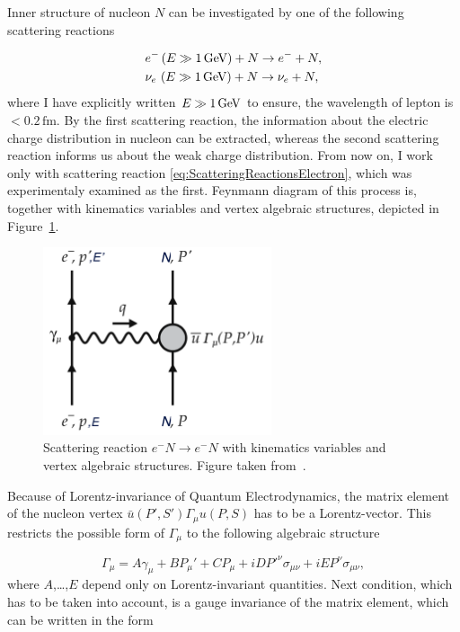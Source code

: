 Inner structure of nucleon $N$ can be investigated by one of the following
scattering reactions

\begin{align}
  &e^- \, (E \gg 1\,\text{GeV}) + N \rightarrow e^- + N,
  \label{eq:ScatteringReactionsElectron} \\
  &\nu_e \,\, (E \gg 1\,\text{GeV}) + N \rightarrow \nu_e + N,
  \label{eq:ScatteringReactionsNeutrino}
\end{align}
where I have explicitly written $E \gg 1 \,\text{GeV}$ to ensure, the wavelength
of lepton is $< 0.2\,\text{fm}$. By the first scattering reaction, the information
about the electric charge distribution in nucleon can be extracted, whereas the
second scattering reaction informs us about the weak charge distribution. 
From now on, I work only with scattering reaction
\eqref{eq:ScatteringReactionsElectron}, which was experimentaly examined as the
first. 
Feynmann diagram of this process is, together with kinematics variables and
vertex algebraic structures, depicted in Figure~\ref{fig:Scattering}. 

\begin{figure}
  \centering
  \includegraphics[width=0.6\textwidth]{Chapter1/Scattering.png} 
  \caption[Scattering reaction $e^-N \rightarrow e^-N$ with kinematics variables
          and vertex algebraic structures.]
          {Scattering reaction $e^-N \rightarrow
          e^-N$ with kinematics variables and vertex algebraic structures.
          Figure taken from~\cite{QCDTextbook}.}
  \label{fig:Scattering}
\end{figure}

Because of Lorentz-invariance of Quantum Electrodynamics, the matrix
element of the nucleon vertex $\bar{u}(P',S')\Gamma_\mu u(P,S)$ has to be a
Lorentz-vector. This restricts the possible form of $\Gamma_\mu$ to the
following algebraic structure

\begin{equation}
  \Gamma_\mu = A \gamma_\mu + B P_\mu' + C P_\mu + i D P'^\nu \sigma_{\mu\nu}
    + i E P^\nu \sigma_{\mu\nu},
  \label{eq:ScatteringAlgebraicMatrix}
\end{equation}
where $A$,\dots,$E$ depend only on Lorentz-invariant quantities. Next condition,
which has to be taken into account, is a gauge invariance of the matrix element, which
can be written in the form


